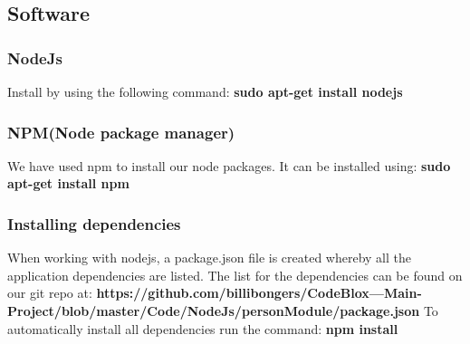 \documentclass[a4paper,12pt]{article}
\begin{document}
		\subsection{Software}
			\subsubsection{NodeJs}
			Install by using the following command: \newline
			\textbf{sudo apt-get install nodejs}
			\subsubsection{NPM(Node package manager)}
			We have used npm to install our node packages. It can be installed using: \newline
			\textbf{sudo apt-get install npm}
			\subsubsection{Installing dependencies}
			When working with nodejs, a package.json file is created whereby all the application dependencies are listed. The list for the dependencies can be found on our git repo at:
			\textbf{https://github.com/billibongers/CodeBlox---Main-Project/blob/master/Code/NodeJs\newline/personModule/package.json}
			\newline\newline
			To automatically install all dependencies run the command:\newline
			\textbf{npm install}
			
\end{document}
